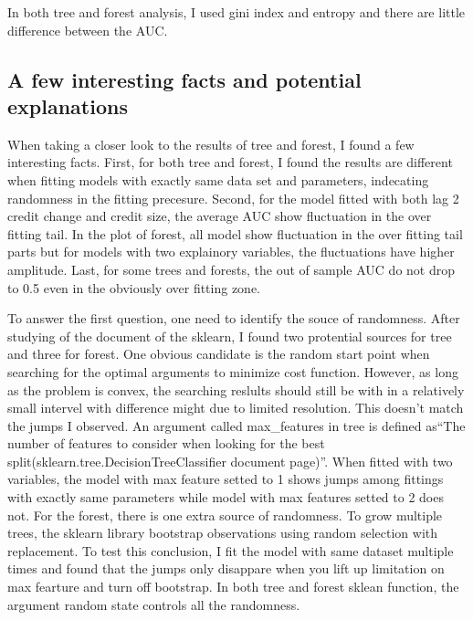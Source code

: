\documentclass{article}
\begin{document}
In both tree and forest analysis, I used gini index and entropy and
there are little difference between the AUC.

\subsection*{A few interesting facts and potential explanations}


When taking a closer look to the results of tree and forest, I found a
few interesting facts. First, for both tree and forest, I found the
results are different when fitting models with exactly same data set and
parameters, indecating randomness in the
fitting precesure. Second, for the
model fitted with both lag 2 credit change and credit size, the average
AUC show fluctuation in the over fitting tail. In the plot of forest,
all model show fluctuation in the over fitting tail parts but for models
with two explainory variables, the fluctuations have higher amplitude.
Last, for some trees and forests, the out
of sample AUC do not drop to 0.5 even in the obviously over fitting
zone.

To answer the first question, one need to identify the souce of
randomness. After studying of the document of
the sklearn, I found two protential sources for tree and three for
forest. One obvious candidate is the random start point when searching
for the optimal arguments to minimize cost function. However, as long as
the problem is convex, the searching reslults should still be with in a
relatively small intervel with difference might due to limited resolution. This
doesn't match the jumps I observed. An argument
called max\_features in tree is defined as``The number of features to consider when
looking for the best split(sklearn.tree.DecisionTreeClassifier document
page)''. When fitted with two variables, the model with max
feature setted to 1 shows jumps among fittings with exactly same
parameters while model with max features setted to 2 does not. For the forest, there is one extra
source of randomness. To grow multiple trees, the sklearn library
bootstrap observations using random selection with replacement. To test
this conclusion, I fit the model with same dataset multiple times and
found that the jumps only disappare when you lift up limitation on max
fearture and turn off bootstrap. In both tree and forest sklean
function, the argument random state controls all the
randomness.
\end{document}
